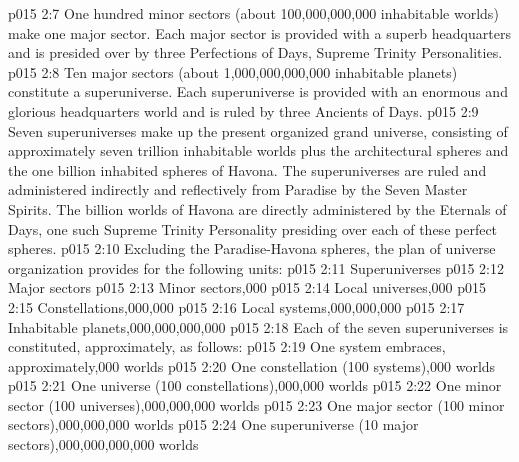 \vs p015 2:7 \pc {}\bibnobreakspace {} One hundred minor sectors (about 100,000,000,000 inhabitable worlds) make one major sector. Each major sector is provided with a superb headquarters and is presided over by three Perfections of Days, Supreme Trinity Personalities.
\vs p015 2:8 \pc {}\bibnobreakspace {} Ten major sectors (about 1,000,000,000,000 inhabitable planets) constitute a superuniverse. Each superuniverse is provided with an enormous and glorious headquarters world and is ruled by three Ancients of Days.
\vs p015 2:9 \pc {}\bibnobreakspace {} Seven superuniverses make up the present organized grand universe, consisting of approximately seven trillion inhabitable worlds plus the architectural spheres and the one billion inhabited spheres of Havona. The superuniverses are ruled and administered indirectly and reflectively from Paradise by the Seven Master Spirits. The billion worlds of Havona are directly administered by the Eternals of Days, one such Supreme Trinity Personality presiding over each of these perfect spheres.
\vs p015 2:10 \pc Excluding the Paradise\hyp{}Havona spheres, the plan of universe organization provides for the following units:
\vs p015 2:11 Superuniverses
\vs p015 2:12 Major sectors
\vs p015 2:13 Minor sectors,000
\vs p015 2:14 Local universes,000
\vs p015 2:15 Constellations,000,000
\vs p015 2:16 Local systems,000,000,000
\vs p015 2:17 \pc Inhabitable planets,000,000,000,000
\vs p015 2:18 Each of the seven superuniverses is constituted, approximately, as follows:
\vs p015 2:19 One system embraces, approximately,000 worlds
\vs p015 2:20 One constellation (100 systems),000 worlds
\vs p015 2:21 One universe (100 constellations),000,000 worlds
\vs p015 2:22 One minor sector (100 universes),000,000,000 worlds
\vs p015 2:23 One major sector (100 minor sectors),000,000,000 worlds
\vs p015 2:24 One superuniverse (10 major sectors),000,000,000,000 worlds
